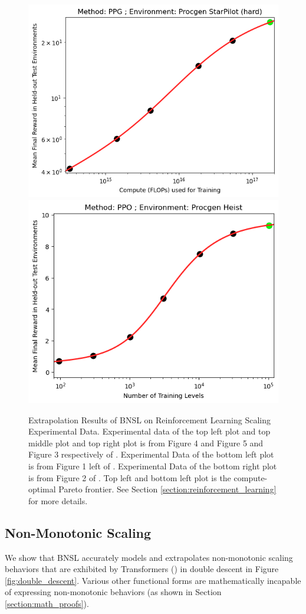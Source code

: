\documentclass{article} %
\begin{document}
\begin{figure}[hhh]
\includegraphics[width=.496\textwidth]{figures/rl/procgen/Procgen_StarPilot_width_compute.png}
\includegraphics[width=.472\textwidth]{figures/rl/procgen/Procgen_Heist.png}
\vspace{-4.0mm}
    \caption{
    Extrapolation Results of BNSL on Reinforcement Learning Scaling Experimental Data. Experimental data of the top left plot and top middle plot and top right plot is from Figure 4 and Figure 5 and Figure 3 respectively of \cite{neumann2022scaling}. Experimental Data of the bottom left plot is from Figure 1 left of \cite{hilton2023scaling}. Experimental Data of the bottom right plot is from Figure 2 of \cite{cobbe2020leveraging}. Top left and bottom left plot is the compute-optimal Pareto frontier. See Section \ref{section:reinforcement_learning} for more details.
    }
    \label{fig:rl_scaling}
\end{figure}
\FloatBarrier

\vspace{-3.1mm}

\clearpage

\subsection{Non-Monotonic Scaling}
\label{section:non-monotonic_scaling}
\vspace{-3.2mm}
We show that BNSL accurately models and extrapolates non-monotonic scaling behaviors that are exhibited by Transformers (\cite{vaswani2017attention}) in double descent \citep{nakkiran2021deep} in Figure \ref{fig:double_descent}. Various other functional forms are mathematically incapable of expressing non-monotonic behaviors (as shown in Section \ref{section:math_proofs}).
\end{document}
